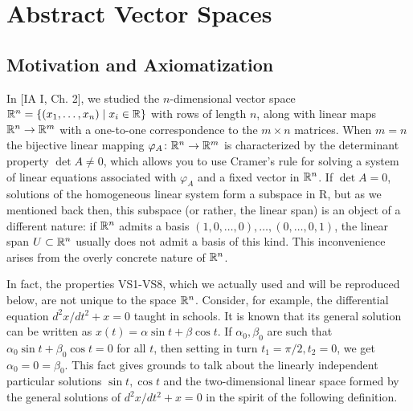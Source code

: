 \section{Abstract Vector Spaces}
\subsection{Motivation and Axiomatization}
In [IA I, Ch. 2], we studied the $n$-dimensional vector space ${\mathbb{R}}^n =\{(x_1,\dots ,x_n)\mid x_i \in {\mathbb{R}}\}$ with rows of length $n$, along with linear maps ${\mathbb{R}}^n \to {\mathbb{R}}^m$ with a one-to-one correspondence to the $m\times n$ matrices. When $m = n$ the bijective linear mapping $\varphi_A\colon {\mathbb{R}}^n \to {\mathbb{R}}^m$ is characterized by the determinant property $\det A \neq 0$, which allows you to use Cramer's rule for solving a system of linear equations associated with $\varphi_A$ and a fixed vector in ${\mathbb{R}}^n$. If $\det A = 0$, solutions of the homogeneous linear system form a subspace in R, but as we mentioned back then, this subspace (or rather, the linear span) is an object of a different nature: if ${\mathbb{R}}^n$ admits a basis $(1,0,\dots ,0),\dots ,(0,\dots ,0,1)$, the linear span $U\subset{\mathbb{R}}^n$ usually does not admit a basis of this kind. This inconvenience arises from the overly concrete nature of ${\mathbb{R}}^n$.

In fact, the properties VS1-VS8, which we actually used and will be reproduced below, are not unique to the space ${\mathbb{R}}^n$. Consider, for example, the differential equation $d^2x/dt^2+ x = 0$ taught in schools. It is known that its general solution can be written as $x (t) = \alpha \sin t+\beta \cos t$. If $\alpha_0 ,\beta_0$ are such that $\alpha_0 \sin t + \beta_0 \cos t = 0$ for all $t$, then setting in turn $t_1=\pi /2,t_2=0$, we get $\alpha_0 = 0 =\beta_0$. This fact gives grounds to talk about the linearly independent particular solutions $\sin t, \cos t$ and the two-dimensional linear space formed by the general solutions of $d^2x/dt^2+ x = 0$ in the spirit of the following definition.

